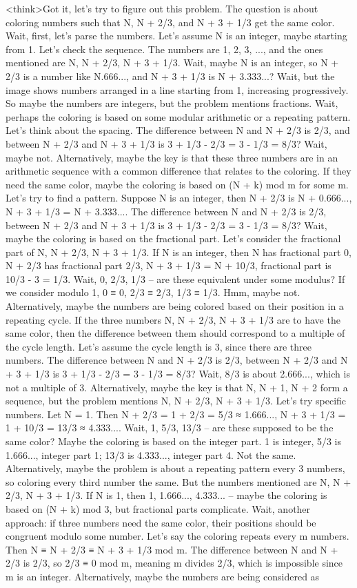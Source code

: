 <think>Got it, let's try to figure out this problem. The question is about coloring numbers such that N, N + 2/3, and N + 3 + 1/3 get the same color. Wait, first, let's parse the numbers. Let's assume N is an integer, maybe starting from 1. Let's check the sequence. The numbers are 1, 2, 3, ..., and the ones mentioned are N, N + 2/3, N + 3 + 1/3. Wait, maybe N is an integer, so N + 2/3 is a number like N.666..., and N + 3 + 1/3 is N + 3.333...? Wait, but the image shows numbers arranged in a line starting from 1, increasing progressively. So maybe the numbers are integers, but the problem mentions fractions. Wait, perhaps the coloring is based on some modular arithmetic or a repeating pattern. Let's think about the spacing. The difference between N and N + 2/3 is 2/3, and between N + 2/3 and N + 3 + 1/3 is 3 + 1/3 - 2/3 = 3 - 1/3 = 8/3? Wait, maybe not. Alternatively, maybe the key is that these three numbers are in an arithmetic sequence with a common difference that relates to the coloring. If they need the same color, maybe the coloring is based on (N + k) mod m for some m. Let's try to find a pattern. Suppose N is an integer, then N + 2/3 is N + 0.666..., N + 3 + 1/3 = N + 3.333.... The difference between N and N + 2/3 is 2/3, between N + 2/3 and N + 3 + 1/3 is 3 + 1/3 - 2/3 = 3 - 1/3 = 8/3? Wait, maybe the coloring is based on the fractional part. Let's consider the fractional part of N, N + 2/3, N + 3 + 1/3. If N is an integer, then N has fractional part 0, N + 2/3 has fractional part 2/3, N + 3 + 1/3 = N + 10/3, fractional part is 10/3 - 3 = 1/3. Wait, 0, 2/3, 1/3 – are these equivalent under some modulus? If we consider modulo 1, 0 ≡ 0, 2/3 ≡ 2/3, 1/3 ≡ 1/3. Hmm, maybe not. Alternatively, maybe the numbers are being colored based on their position in a repeating cycle. If the three numbers N, N + 2/3, N + 3 + 1/3 are to have the same color, then the difference between them should correspond to a multiple of the cycle length. Let's assume the cycle length is 3, since there are three numbers. The difference between N and N + 2/3 is 2/3, between N + 2/3 and N + 3 + 1/3 is 3 + 1/3 - 2/3 = 3 - 1/3 = 8/3? Wait, 8/3 is about 2.666..., which is not a multiple of 3. Alternatively, maybe the key is that N, N + 1, N + 2 form a sequence, but the problem mentions N, N + 2/3, N + 3 + 1/3. Let's try specific numbers. Let N = 1. Then N + 2/3 = 1 + 2/3 = 5/3 ≈ 1.666..., N + 3 + 1/3 = 1 + 10/3 = 13/3 ≈ 4.333.... Wait, 1, 5/3, 13/3 – are these supposed to be the same color? Maybe the coloring is based on the integer part. 1 is integer, 5/3 is 1.666..., integer part 1; 13/3 is 4.333..., integer part 4. Not the same. Alternatively, maybe the problem is about a repeating pattern every 3 numbers, so coloring every third number the same. But the numbers mentioned are N, N + 2/3, N + 3 + 1/3. If N is 1, then 1, 1.666..., 4.333... – maybe the coloring is based on (N + k) mod 3, but fractional parts complicate. Wait, another approach: if three numbers need the same color, their positions should be congruent modulo some number. Let's say the coloring repeats every m numbers. Then N ≡ N + 2/3 ≡ N + 3 + 1/3 mod m. The difference between N and N + 2/3 is 2/3, so 2/3 ≡ 0 mod m, meaning m divides 2/3, which is impossible since m is an integer. Alternatively, maybe the numbers are being considered as 
